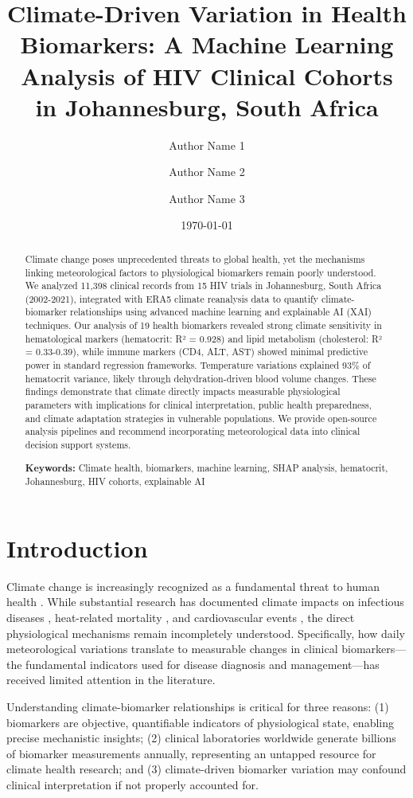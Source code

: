 \documentclass[11pt,a4paper]{article}
\title{Climate-Driven Variation in Health Biomarkers: A Machine Learning Analysis of HIV Clinical Cohorts in Johannesburg, South Africa}
\author[1]{Author Name 1}
\author[1,2]{Author Name 2}
\author[3]{Author Name 3}
\affil[1]{Department/Institution 1}
\affil[2]{Department/Institution 2}
\affil[3]{Department/Institution 3}
\date{\today}
\begin{document}
\maketitle

\begin{abstract}
Climate change poses unprecedented threats to global health, yet the mechanisms linking meteorological factors to physiological biomarkers remain poorly understood. We analyzed 11,398 clinical records from 15 HIV trials in Johannesburg, South Africa (2002-2021), integrated with ERA5 climate reanalysis data to quantify climate-biomarker relationships using advanced machine learning and explainable AI (XAI) techniques. Our analysis of 19 health biomarkers revealed strong climate sensitivity in hematological markers (hematocrit: R² = 0.928) and lipid metabolism (cholesterol: R² = 0.33-0.39), while immune markers (CD4, ALT, AST) showed minimal predictive power in standard regression frameworks. Temperature variations explained 93\% of hematocrit variance, likely through dehydration-driven blood volume changes. These findings demonstrate that climate directly impacts measurable physiological parameters with implications for clinical interpretation, public health preparedness, and climate adaptation strategies in vulnerable populations. We provide open-source analysis pipelines and recommend incorporating meteorological data into clinical decision support systems.

\textbf{Keywords:} Climate health, biomarkers, machine learning, SHAP analysis, hematocrit, Johannesburg, HIV cohorts, explainable AI
\end{abstract}

\section{Introduction}

Climate change is increasingly recognized as a fundamental threat to human health \citep{watts2021lancet}. While substantial research has documented climate impacts on infectious diseases \citep{ryan2019climate}, heat-related mortality \citep{guo2014quantifying}, and cardiovascular events \citep{gasparrini2015mortality}, the direct physiological mechanisms remain incompletely understood. Specifically, how daily meteorological variations translate to measurable changes in clinical biomarkers—the fundamental indicators used for disease diagnosis and management—has received limited attention in the literature.

Understanding climate-biomarker relationships is critical for three reasons: (1) biomarkers are objective, quantifiable indicators of physiological state, enabling precise mechanistic insights; (2) clinical laboratories worldwide generate billions of biomarker measurements annually, representing an untapped resource for climate health research; and (3) climate-driven biomarker variation may confound clinical interpretation if not properly accounted for.
\end{document}
